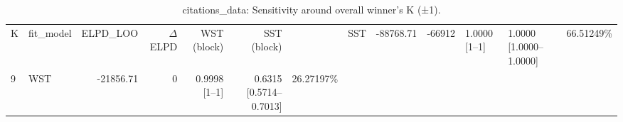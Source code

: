 \begin{table}[!h]
\centering
\caption{citations_data: Sensitivity around overall winner's K (±1).\\\label{tab:app-citations_data-C-sensitivity}}
\centering
\begin{tabular}[t]{llrrrrr}
\toprule
K & fit_model & ELPD\_LOO & $\Delta$ELPD & WST (block) & SST (block) & %
 & SST & -88768.71 & -66912 & 1.0000 [1--1] & 1.0000 [1.0000--1.0000] & 66.51249\%\\
9 & WST & -21856.71 & 0 & 0.9998 [1--1] & 0.6315 [0.5714--0.7013] & 26.27197\%\\
\bottomrule
\end{tabular}
\end{table}
